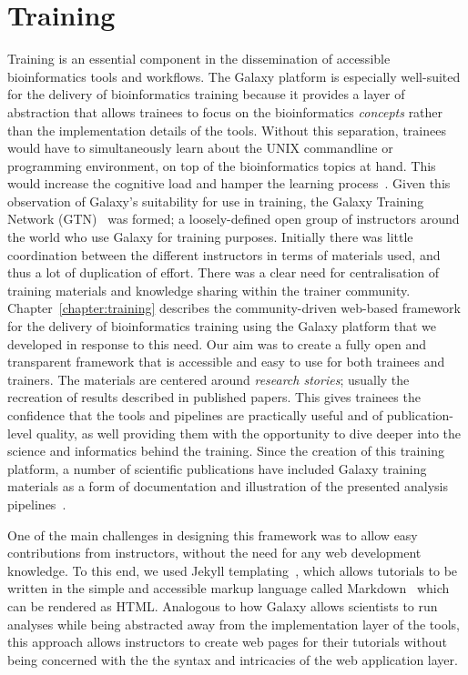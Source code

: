 \section{Training}
Training is an essential component in the dissemination of accessible bioinformatics tools and workflows. The Galaxy platform is especially well-suited for the delivery of bioinformatics training because it provides a layer of abstraction that allows trainees to focus on the bioinformatics \emph{concepts} rather than the implementation details of the tools. Without this separation, trainees would have to simultaneously learn about the UNIX commandline or programming environment, on top of the bioinformatics topics at hand. This would increase the cognitive load and hamper the learning process~\cite{paas2003cognitive}. Given this observation of Galaxy's suitability for use in training, the Galaxy Training Network (GTN)~\cite{url-gtn} was formed; a loosely-defined open group of instructors around the world who use Galaxy for training purposes. Initially there was little coordination between the different instructors in terms of materials used, and thus a lot of duplication of effort. There was a clear need for centralisation of training materials and knowledge sharing within the trainer community. Chapter~\ref{chapter:training} describes the community-driven web-based framework for the delivery of bioinformatics training using the Galaxy platform that we developed in response to this need.
Our aim was to create a fully open and transparent framework that is accessible and easy to use for both trainees and trainers. The materials are centered around \emph{research stories}; usually the recreation of results described in published papers. This gives trainees the confidence that the tools and pipelines are practically useful and of publication-level quality, as well providing them with the opportunity to dive deeper into the science and informatics behind the training. Since the creation of this training platform, a number of scientific publications have included Galaxy training materials as a form of documentation and illustration of the presented analysis pipelines~\cite{gruning2017rna,blank2018disseminating,batut2017asaim,hiltemann2018galaxy}.

One of the main challenges in designing this framework was to allow easy contributions from instructors, without the need for any web development knowledge. To this end, we used Jekyll templating~\cite{url-jekyll}, which allows tutorials to be written in the simple and accessible markup language called Markdown~\cite{url-markdown} which can be rendered as HTML. Analogous to how Galaxy allows scientists to run analyses while being abstracted away from the implementation layer of the tools, this approach allows instructors to create web pages for their tutorials without being concerned with the the syntax and intricacies of the web application layer.

